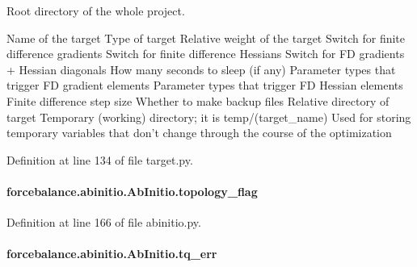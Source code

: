 Root directory of the whole project. 

Name of the target Type of target Relative weight of the target Switch for finite difference gradients Switch for finite difference Hessians Switch for F\-D gradients + Hessian diagonals How many seconds to sleep (if any) Parameter types that trigger F\-D gradient elements Parameter types that trigger F\-D Hessian elements Finite difference step size Whether to make backup files Relative directory of target Temporary (working) directory; it is temp/(target\-\_\-name) Used for storing temporary variables that don't change through the course of the optimization 

Definition at line 134 of file target.\-py.

\hypertarget{classforcebalance_1_1abinitio_1_1AbInitio_a09689e626b75720b097c36f922507950}{
\paragraph[{topology\-\_\-flag}]{\setlength{\rightskip}{0pt plus 5cm}forcebalance.\-abinitio.\-Ab\-Initio.\-topology\-\_\-flag\hspace{0.3cm}{\ttfamily [inherited]}}}\label{classforcebalance_1_1abinitio_1_1AbInitio_a09689e626b75720b097c36f922507950}


Definition at line 166 of file abinitio.\-py.

\hypertarget{classforcebalance_1_1abinitio_1_1AbInitio_ae60e834d5b5bf13f8fb70d403a97db28}{
\paragraph[{tq\-\_\-err}]{\setlength{\rightskip}{0pt plus 5cm}forcebalance.\-abinitio.\-Ab\-Initio.\-tq\-\_\-err\hspace{0.3cm}{\ttfamily [inherited]}}}\label{classforcebalance_1_1abinitio_1_1AbInitio_ae60e834d5b5bf13f8fb70d403a97db28}


